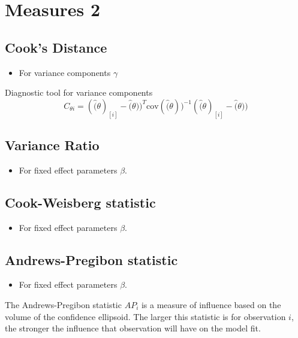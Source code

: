 \documentclass[12pt, a4paper]{article}
\begin{document}
\section{Measures 2} %

\subsection{Cook's Distance} %
\begin{itemize}
	\item For variance components $\gamma$
\end{itemize}

Diagnostic tool for variance components
\[ C_{\theta i} =(\hat(\theta)_{[i]} - \hat(\theta))^{T}\mbox{cov}( \hat(\theta))^{-1}(\hat(\theta)_{[i]} - \hat(\theta))\]

\subsection{Variance Ratio} %
\begin{itemize}
	\item For fixed effect parameters $\beta$.
\end{itemize}

\subsection{Cook-Weisberg statistic} %
\begin{itemize}
	\item For fixed effect parameters $\beta$.
\end{itemize}

\subsection{Andrews-Pregibon statistic} %
\begin{itemize}
	\item For fixed effect parameters $\beta$.
\end{itemize}
The Andrews-Pregibon statistic $AP_{i}$ is a measure of influence based on the volume of the confidence ellipsoid.
The larger this statistic is for observation $i$, the stronger the influence that observation will have on the model fit.


\end{document}
